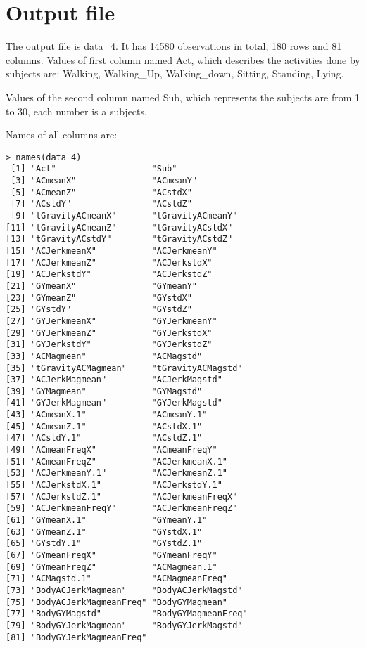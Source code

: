 \documentclass[11pt]{article}
\begin{document}
\section{Output file}
The output file is \textsf{data\_4}. It has 14580 observations in total, 180 rows and 81 columns.
Values of first column named \textsf{Act}, which describes the activities done by subjects are: \textsf{Walking}, \textsf{Walking\_Up},  \textsf{Walking\_down}, \textsf{Sitting}, \textsf{Standing}, \textsf{Lying}.

Values of the second column named \textsf{Sub}, which represents the subjects are from 1 to 30, each number is a subjects.

Names of all columns are:
\begin{lstlisting}
> names(data_4)
 [1] "Act"                   "Sub"                  
 [3] "ACmeanX"               "ACmeanY"              
 [5] "ACmeanZ"               "ACstdX"               
 [7] "ACstdY"                "ACstdZ"               
 [9] "tGravityACmeanX"       "tGravityACmeanY"      
[11] "tGravityACmeanZ"       "tGravityACstdX"       
[13] "tGravityACstdY"        "tGravityACstdZ"       
[15] "ACJerkmeanX"           "ACJerkmeanY"          
[17] "ACJerkmeanZ"           "ACJerkstdX"           
[19] "ACJerkstdY"            "ACJerkstdZ"           
[21] "GYmeanX"               "GYmeanY"              
[23] "GYmeanZ"               "GYstdX"               
[25] "GYstdY"                "GYstdZ"               
[27] "GYJerkmeanX"           "GYJerkmeanY"          
[29] "GYJerkmeanZ"           "GYJerkstdX"           
[31] "GYJerkstdY"            "GYJerkstdZ"           
[33] "ACMagmean"             "ACMagstd"             
[35] "tGravityACMagmean"     "tGravityACMagstd"     
[37] "ACJerkMagmean"         "ACJerkMagstd"         
[39] "GYMagmean"             "GYMagstd"             
[41] "GYJerkMagmean"         "GYJerkMagstd"         
[43] "ACmeanX.1"             "ACmeanY.1"            
[45] "ACmeanZ.1"             "ACstdX.1"             
[47] "ACstdY.1"              "ACstdZ.1"             
[49] "ACmeanFreqX"           "ACmeanFreqY"          
[51] "ACmeanFreqZ"           "ACJerkmeanX.1"        
[53] "ACJerkmeanY.1"         "ACJerkmeanZ.1"        
[55] "ACJerkstdX.1"          "ACJerkstdY.1"         
[57] "ACJerkstdZ.1"          "ACJerkmeanFreqX"      
[59] "ACJerkmeanFreqY"       "ACJerkmeanFreqZ"      
[61] "GYmeanX.1"             "GYmeanY.1"            
[63] "GYmeanZ.1"             "GYstdX.1"             
[65] "GYstdY.1"              "GYstdZ.1"             
[67] "GYmeanFreqX"           "GYmeanFreqY"          
[69] "GYmeanFreqZ"           "ACMagmean.1"          
[71] "ACMagstd.1"            "ACMagmeanFreq"        
[73] "BodyACJerkMagmean"     "BodyACJerkMagstd"     
[75] "BodyACJerkMagmeanFreq" "BodyGYMagmean"        
[77] "BodyGYMagstd"          "BodyGYMagmeanFreq"    
[79] "BodyGYJerkMagmean"     "BodyGYJerkMagstd"     
[81] "BodyGYJerkMagmeanFreq"
\end{lstlisting}
\end{document}
